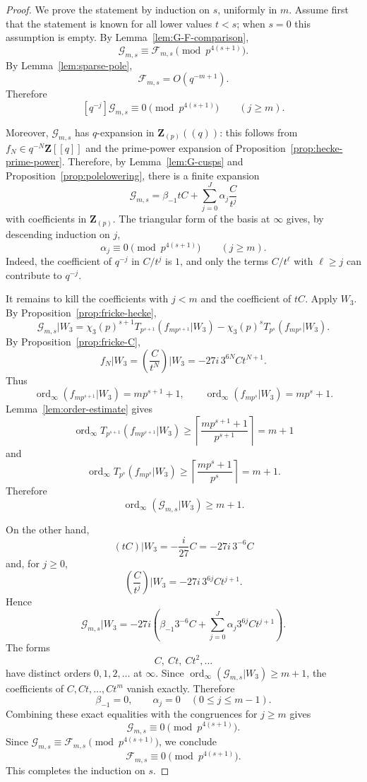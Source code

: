 \documentclass[11pt]{amsart}
\theoremstyle{remark}
\DeclareMathOperator{\ord}{ord}
\newcommand{\Z}{\mathbf Z}
\begin{document}
\begin{proof}
We prove the statement by induction on $s$, uniformly in $m$.
Assume first that the statement is known for all lower values $t<s$; when $s=0$ this assumption is empty.
By Lemma~\ref{lem:G-F-comparison},
\[
 \mathcal G_{m,s}\equiv\mathcal F_{m,s}\pmod {p^{4(s+1)}}.
\]
By Lemma~\ref{lem:sparse-pole},
\[
 \mathcal F_{m,s}=O(q^{-m+1}).
\]
Therefore
\[
 [q^{-j}]\mathcal G_{m,s}\equiv0\pmod {p^{4(s+1)}}
 \qquad(j\ge m).
\]

Moreover, $\mathcal G_{m,s}$ has $q$-expansion in $\Z_{(p)}((q))$: this follows from $f_N\in q^{-N}\Z[[q]]$ and the prime-power expansion of Proposition~\ref{prop:hecke-prime-power}.  Therefore, by Lemma~\ref{lem:G-cusps} and Proposition~\ref{prop:polelowering}, there is a finite expansion
\[
 \mathcal G_{m,s}=\beta_{-1}tC+\sum_{j=0}^{J}\alpha_j\frac{C}{t^j}
\]
with coefficients in $\Z_{(p)}$.  The triangular form of the basis at $\infty$ gives, by descending induction on $j$,
\[
 \alpha_j\equiv0\pmod {p^{4(s+1)}}
 \qquad(j\ge m).
\]
Indeed, the coefficient of $q^{-j}$ in $C/t^j$ is $1$, and only the terms $C/t^\ell$ with $\ell\ge j$ can contribute to $q^{-j}$.

It remains to kill the coefficients with $j<m$ and the coefficient of $tC$.  Apply $W_3$.  By Proposition~\ref{prop:fricke-hecke},
\[
 \mathcal G_{m,s}|W_3
 =\chi_3(p)^{s+1}T_{p^{s+1}}(f_{mp^{s+1}}|W_3)
 -\chi_3(p)^sT_{p^s}(f_{mp^s}|W_3).
\]
By Proposition~\ref{prop:fricke-C},
\[
 f_N|W_3=\left(\frac{C}{t^N}\right)\Big|W_3
 =-27i\,3^{6N}Ct^{N+1}.
\]
Thus
\[
 \ord_\infty(f_{mp^{s+1}}|W_3)=mp^{s+1}+1,
 \qquad
 \ord_\infty(f_{mp^s}|W_3)=mp^s+1.
\]
Lemma~\ref{lem:order-estimate} gives
\[
 \ord_\infty T_{p^{s+1}}(f_{mp^{s+1}}|W_3)
 \ge\left\lceil\frac{mp^{s+1}+1}{p^{s+1}}\right\rceil=m+1
\]
and
\[
 \ord_\infty T_{p^s}(f_{mp^s}|W_3)
 \ge\left\lceil\frac{mp^s+1}{p^s}\right\rceil=m+1.
\]
Therefore
\[
 \ord_\infty(\mathcal G_{m,s}|W_3)\ge m+1.
\]

On the other hand,
\[
 (tC)|W_3=-\frac{i}{27}C=-27i\,3^{-6}C
\]
and, for $j\ge0$,
\[
 \left(\frac{C}{t^j}\right)\Big|W_3
 =-27i\,3^{6j}Ct^{j+1}.
\]
Hence
\[
 \mathcal G_{m,s}|W_3
 =-27i\left(\beta_{-1}3^{-6}C+
 \sum_{j=0}^{J}\alpha_j3^{6j}Ct^{j+1}\right).
\]
The forms
\[
 C,\ Ct,\ Ct^2,\ldots
\]
have distinct orders $0,1,2,\ldots$ at $\infty$.  Since $\ord_\infty(\mathcal G_{m,s}|W_3)\ge m+1$, the coefficients of $C,Ct,\ldots,Ct^m$ vanish exactly.  Therefore
\[
 \beta_{-1}=0,
 \qquad
 \alpha_j=0\quad(0\le j\le m-1).
\]
Combining these exact equalities with the congruences for $j\ge m$ gives
\[
 \mathcal G_{m,s}\equiv0\pmod {p^{4(s+1)}}.
\]
Since $\mathcal G_{m,s}\equiv\mathcal F_{m,s}\pmod {p^{4(s+1)}}$, we conclude
\[
 \mathcal F_{m,s}\equiv0\pmod {p^{4(s+1)}}.
\]
This completes the induction on $s$.
\end{proof}
\end{document}
